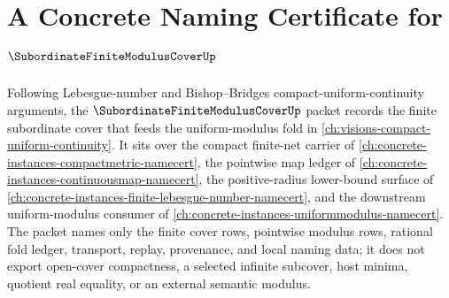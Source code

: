 \chapter{A Concrete Naming Certificate for $\SubordinateFiniteModulusCoverUp$}
\label{ch:concrete-instances-subordinate-finite-modulus-cover-namecert}

Following Lebesgue-number and Bishop--Bridges compact-uniform-continuity arguments, the $\SubordinateFiniteModulusCoverUp$ packet records the finite subordinate cover that feeds the uniform-modulus fold in \autoref{ch:visions-compact-uniform-continuity}. It sits over the compact finite-net carrier of \autoref{ch:concrete-instances-compactmetric-namecert}, the pointwise map ledger of \autoref{ch:concrete-instances-continuousmap-namecert}, the positive-radius lower-bound surface of \autoref{ch:concrete-instances-finite-lebesgue-number-namecert}, and the downstream uniform-modulus consumer of \autoref{ch:concrete-instances-uniformmodulus-namecert}. The packet names only the finite cover rows, pointwise modulus rows, rational fold ledger, transport, replay, provenance, and local naming data; it does not export open-cover compactness, a selected infinite subcover, host minima, quotient real equality, or an external semantic modulus.

